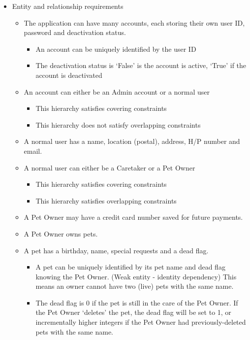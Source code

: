 \documentclass[10pt]{article}
\begin{document}
\begin{itemize}
    \item Entity and relationship requirements
    \begin{itemize}
        \item The application can have many accounts, each storing their own user ID, password and deactivation status.
	    \begin{itemize}
	        \item An account can be uniquely identified by the user ID
	        \item The deactivation status is `False' is the account is active, `True' if the account is deactivated
	    \end{itemize}
        \item An account can either be an Admin account or a normal user
	    \begin{itemize}
	        \item This hierarchy satisfies covering constraints
	        \item This hierarchy does not satisfy overlapping constraints
	    \end{itemize}
		\item A normal user has a name, location (postal), address, H/P number and email.
        \item A normal user can either be a Caretaker or a Pet Owner
        \begin{itemize}
	        \item This hierarchy satisfies covering constraints
	        \item This hierarchy satisfies overlapping constraints
	    \end{itemize}
        \item A Pet Owner may have a credit card number saved for future payments.
        \item A Pet Owner owns pets.
        \item A pet has a birthday, name, special requests and a dead flag.
        \begin{itemize}
            \item A pet can be uniquely identified by its pet name and dead flag knowing the Pet Owner. (Weak entity - identity dependency) This means an owner cannot have two (live) pets with the same name.
            \item The dead flag is 0 if the pet is still in the care of the Pet Owner. If the Pet Owner `deletes' the pet, the dead flag will be set to 1, or incrementally higher integers if the Pet Owner had previously-deleted pets with the same name.

\end{itemize}
\end{itemize}
\end{itemize}
\end{document}
